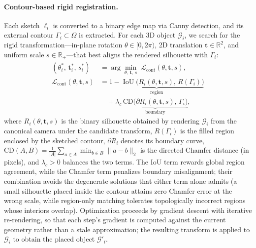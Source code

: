 \paragraph{Contour-based rigid registration.}
Each sketch $\ell_i$ is converted to a binary edge map via Canny
detection, and its external contour $\Gamma_i \subset \Omega$ is
extracted. For each 3D object $\mathcal{G}_i$, we search for the rigid
transformation---in-plane rotation $\theta \in [0,2\pi)$, 2D translation
$\mathbf{t} \in \mathbb{R}^2$, and uniform scale $s \in
\mathbb{R}_{+}$---that best aligns the rendered silhouette with
$\Gamma_i$:
\begin{align}
    (\theta_i^{*},\, \mathbf{t}_i^{*},\, s_i^{*}) &=
      \arg\min_{\theta,\,\mathbf{t},\,s}\;
      \mathcal{L}_{\mathrm{cont}}(\theta,\mathbf{t},s),
      \label{eq:contour_reg}\\
    \mathcal{L}_{\mathrm{cont}}(\theta,\mathbf{t},s) &=
      \underbrace{1 - \operatorname{IoU}\bigl(R_i(\theta,\mathbf{t},s),
        \,R(\Gamma_i)\bigr)}_{\text{region}}
      \nonumber\\[-2pt]
    &\quad + \lambda_c \,
      \underbrace{\mathrm{CD}\bigl(\partial R_i(\theta,\mathbf{t},s),
        \,\Gamma_i\bigr)}_{\text{boundary}},
      \nonumber
\end{align}
where $R_i(\theta,\mathbf{t},s)$ is the binary silhouette obtained by
rendering $\mathcal{G}_i$ from the canonical camera under the candidate
transform, $R(\Gamma_i)$ is the filled region enclosed by the sketched
contour, $\partial R_i$ denotes its boundary curve, $\mathrm{CD}(A,B) =
\tfrac{1}{|A|}\sum_{a \in A} \min_{b \in B} \|a - b\|_2$ is the directed
Chamfer distance (in pixels), and $\lambda_c > 0$ balances the two
terms. The IoU term rewards global region agreement, while the Chamfer
term penalizes boundary misalignment; their combination avoids the
degenerate solutions that either term alone admits (a small silhouette
placed inside the contour attains zero Chamfer error at the wrong
scale, while region-only matching tolerates topologically incorrect
regions whose interiors overlap). Optimization proceeds by gradient
descent with iterative re-rendering, so that each step's gradient is
computed against the current geometry rather than a stale
approximation; the resulting transform is applied to $\mathcal{G}_i$
to obtain the placed object $\mathcal{G}'_i$.

